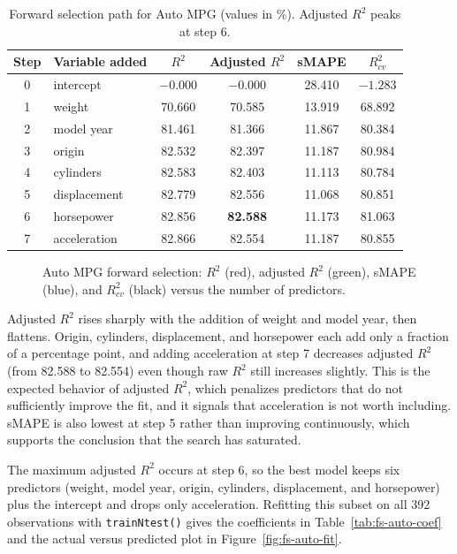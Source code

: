 \begin{table}[H]
    \centering
    \caption{Forward selection path for Auto MPG (values in \%). Adjusted $R^2$ peaks at step 6.}
    \label{tab:fs-auto-path}
    \begin{tabular}{clcccc}
        \hline
        Step & Variable added & $R^2$ & Adjusted $R^2$ & sMAPE & $R^2_{cv}$ \\
        \hline
        0 & intercept & $-0.000$ & $-0.000$ & 28.410 & $-1.283$ \\
        1 & weight & 70.660 & 70.585 & 13.919 & 68.892 \\
        2 & model year & 81.461 & 81.366 & 11.867 & 80.384 \\
        3 & origin & 82.532 & 82.397 & 11.187 & 80.984 \\
        4 & cylinders & 82.583 & 82.403 & 11.113 & 80.784 \\
        5 & displacement & 82.779 & 82.556 & 11.068 & 80.851 \\
        6 & horsepower & 82.856 & \textbf{82.588} & 11.173 & 81.063 \\
        7 & acceleration & 82.866 & 82.554 & 11.187 & 80.855 \\
        \hline
    \end{tabular}
\end{table}

\begin{figure}[H]
    \centering
    \caption{Auto MPG forward selection: $R^2$ (red), adjusted $R^2$ (green), sMAPE (blue), and $R^2_{cv}$ (black) versus the number of predictors.}
    \label{fig:fs-auto-path}
\end{figure}

Adjusted $R^2$ rises sharply with the addition of weight and model year, then flattens. Origin, cylinders, displacement, and horsepower each add only a fraction of a percentage point, and adding acceleration at step 7 decreases adjusted $R^2$ (from 82.588 to 82.554) even though raw $R^2$ still increases slightly. This is the expected behavior of adjusted $R^2$, which penalizes predictors that do not sufficiently improve the fit, and it signals that acceleration is not worth including. sMAPE is also lowest at step 5 rather than improving continuously, which supports the conclusion that the search has saturated.

\vspace{0.3cm}

The maximum adjusted $R^2$ occurs at step 6, so the best model keeps six predictors (weight, model year, origin, cylinders, displacement, and horsepower) plus the intercept and drops only acceleration. Refitting this subset on all 392 observations with \texttt{trainNtest()} gives the coefficients in Table~\ref{tab:fs-auto-coef} and the actual versus predicted plot in Figure~\ref{fig:fs-auto-fit}.

